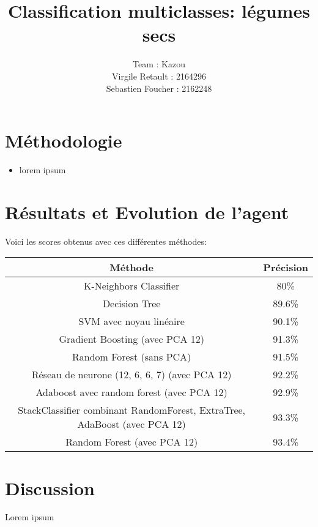 \documentclass[12pt]{article}
\title{Classification multiclasses: légumes secs}
\author{
  Team : Kazou\\
  Virgile Retault : 2164296\\
  Sebastien Foucher : 2162248
}
\begin{document}
\maketitle

\section*{Méthodologie}
\newpage

\begin{itemize}
	\item lorem ipsum
	
\end{itemize}


\section*{Résultats et Evolution de l'agent}

Voici les scores obtenus avec ces différentes méthodes:
\begin{center}
	\begin{tabular}{ |c|c| }
		\hline
		Méthode & Précision \\\hline\hline
	  K-Neighbors Classifier & 80\% \\\hline
		Decision Tree & 89.6\% \\\hline
		SVM avec noyau linéaire & 90.1\% \\\hline
		Gradient Boosting (avec PCA 12) & 91.3\% \\\hline
		Random Forest (sans PCA) & 91.5\% \\\hline
		Réseau de neurone (12, 6, 6, 7) (avec PCA 12) & 92.2\% \\\hline
		Adaboost avec random forest (avec PCA 12) & 92.9\% \\\hline
		StackClassifier combinant RandomForest, ExtraTree, AdaBoost (avec PCA 12) & 93.3\% \\\hline
		Random Forest (avec PCA 12) & 93.4\% \\\hline

	\end{tabular} 
\end{center}


\section*{Discussion}

Lorem ipsum
\end{document}
